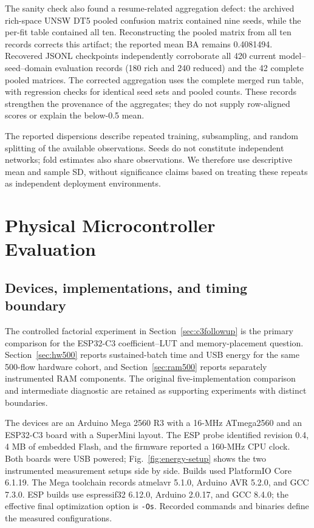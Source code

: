 \documentclass{ieeeaccess}
\begin{document}
The sanity check also found a resume-related aggregation defect: the archived rich-space UNSW DT5 pooled confusion matrix contained nine seeds, while the per-fit table contained all ten. Reconstructing the pooled matrix from all ten records corrects this artifact; the reported mean BA remains 0.4081494. Recovered JSONL checkpoints independently corroborate all 420 current model--seed--domain evaluation records (180 rich and 240 reduced) and the 42 complete pooled matrices. The corrected aggregation uses the complete merged run table, with regression checks for identical seed sets and pooled counts. These records strengthen the provenance of the aggregates; they do not supply row-aligned scores or explain the below-0.5 mean.

The reported dispersions describe repeated training, subsampling, and random splitting of the available observations. Seeds do not constitute independent networks; fold estimates also share observations. We therefore use descriptive mean and sample SD, without significance claims based on treating these repeats as independent deployment environments.

\section{Physical Microcontroller Evaluation}
\subsection{Devices, implementations, and timing boundary}
The controlled factorial experiment in Section~\ref{sec:c3followup} is the primary comparison for the ESP32-C3 coefficient--LUT and memory-placement question. Section~\ref{sec:hw500} reports sustained-batch time and USB energy for the same 500-flow hardware cohort, and Section~\ref{sec:ram500} reports separately instrumented RAM components. The original five-implementation comparison and intermediate diagnostic are retained as supporting experiments with distinct boundaries.

The devices are an Arduino Mega 2560 R3 with a 16-MHz ATmega2560 and an ESP32-C3 board with a SuperMini layout. The ESP probe identified revision 0.4, 4 MB of embedded Flash, and the firmware reported a 160-MHz CPU clock. Both boards were USB powered; Fig.~\ref{fig:energy-setup} shows the two instrumented measurement setups side by side. Builds used PlatformIO Core 6.1.19. The Mega toolchain records atmelavr 5.1.0, Arduino AVR 5.2.0, and GCC 7.3.0. ESP builds use espressif32 6.12.0, Arduino 2.0.17, and GCC 8.4.0; the effective final optimization option is \texttt{-Os}. Recorded commands and binaries define the measured configurations.
\end{document}
